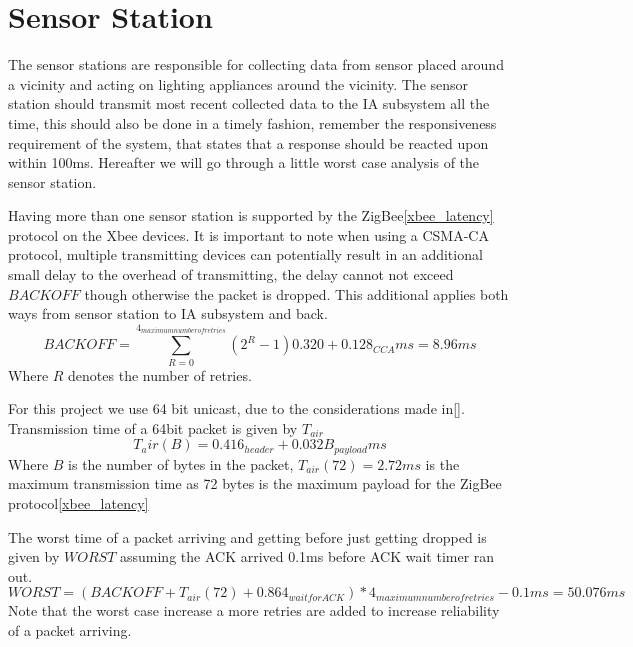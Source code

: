 \section{Sensor Station}\label{sub:sensorStation}

The sensor stations are responsible for collecting data from sensor placed around a vicinity and acting on lighting appliances around the vicinity. The sensor station should transmit most recent collected data to the IA subsystem all the time, this should also be done in a timely fashion, remember the responsiveness requirement of the system, that states that a response should be reacted upon within 100ms. Hereafter we will go through a little worst case analysis of the sensor station.


Having more than one sensor station is supported by the ZigBee\cref{xbee_latency} protocol on the Xbee devices. It is important to note when using a CSMA-CA protocol, multiple transmitting devices can potentially result in an additional small delay to the overhead of transmitting, the delay cannot not exceed $BACKOFF$ though otherwise the packet is dropped. This additional applies both ways from sensor station to IA subsystem and back.
\begin{equation*}
BACKOFF = \sum\limits_{R=0}^{4_{maximum number of retries}}(2^{R} - 1) 0.320 + 0.128_{CCA} ms = 8.96 ms
\end{equation*}
Where $R$ denotes the number of retries.

For this project we use 64 bit unicast, due to the considerations made in\cref{}.
Transmission time of a 64bit packet is given by $T_{air}$
\begin{equation*}
T_air(B) = 0.416_{header} + 0.032B_{payload} ms
\end{equation*}
Where $B$ is the number of bytes in the packet, $T_{air}(72) = 2.72 ms$ is the maximum transmission time as 72 bytes is the maximum payload for the ZigBee protocol\cref{xbee_latency}

The worst time of a packet arriving and getting before just getting dropped is given by $WORST$ assuming the ACK arrived 0.1ms before ACK wait timer ran out.
\begin{equation*}
WORST = (BACKOFF + T_{air}(72) + 0.864_{wait for ACK})*4_{maximum number of retries} - 0.1 ms = 50.076 ms
\end{equation*}
Note that the worst case increase a more retries are added to increase reliability of a packet arriving.

